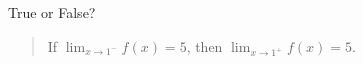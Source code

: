 \documentclass{ximera}
\author{Gregory Hartman \and Matthew Carr}
\begin{document}
\begin{exercise}



True or False?
\begin{quote}
If $\lim_{x\to1^{-}}f(x)=5$, then $\lim_{x\to1^{+}}f(x)=5$.
\end{quote}

\begin{prompt}
\begin{multipleChoice}
\end{multipleChoice}
\end{prompt}

\end{exercise}
\end{document}
